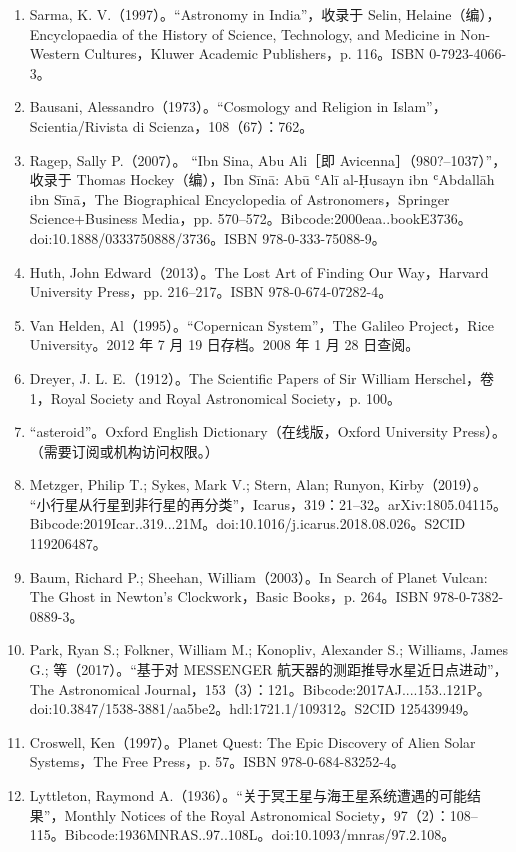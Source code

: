 \begin{enumerate}
\item Sarma, K. V.（1997）。“Astronomy in India”，收录于 Selin, Helaine（编），Encyclopaedia of the History of Science, Technology, and Medicine in Non-Western Cultures，Kluwer Academic Publishers，p. 116。ISBN 0-7923-4066-3。
\item Bausani, Alessandro（1973）。“Cosmology and Religion in Islam”，Scientia/Rivista di Scienza，108（67）：762。
\item Ragep, Sally P.（2007）。
“Ibn Sina, Abu Ali［即 Avicenna］（980?–1037）”，收录于 Thomas Hockey（编），Ibn Sīnā: Abū ʿAlī al-Ḥusayn ibn ʿAbdallāh ibn Sīnā，The Biographical Encyclopedia of Astronomers，Springer Science+Business Media，pp. 570–572。Bibcode:2000eaa..bookE3736。doi:10.1888/0333750888/3736。ISBN 978-0-333-75088-9。
\item Huth, John Edward（2013）。The Lost Art of Finding Our Way，Harvard University Press，pp. 216–217。ISBN 978-0-674-07282-4。
\item Van Helden, Al（1995）。“Copernican System”，The Galileo Project，Rice University。2012 年 7 月 19 日存档。2008 年 1 月 28 日查阅。
\item Dreyer, J. L. E.（1912）。The Scientific Papers of Sir William Herschel，卷 1，Royal Society and Royal Astronomical Society，p. 100。
\item “asteroid”。Oxford English Dictionary（在线版，Oxford University Press）。 （需要订阅或机构访问权限。）
\item Metzger, Philip T.; Sykes, Mark V.; Stern, Alan; Runyon, Kirby（2019）。
“小行星从行星到非行星的再分类”，Icarus，319：21–32。arXiv:1805.04115。Bibcode:2019Icar..319...21M。doi:10.1016/j.icarus.2018.08.026。S2CID 119206487。
\item Baum, Richard P.; Sheehan, William（2003）。In Search of Planet Vulcan: The Ghost in Newton's Clockwork，Basic Books，p. 264。ISBN 978-0-7382-0889-3。
\item Park, Ryan S.; Folkner, William M.; Konopliv, Alexander S.; Williams, James G.; 等（2017）。“基于对 MESSENGER 航天器的测距推导水星近日点进动”，The Astronomical Journal，153（3）：121。Bibcode:2017AJ....153..121P。doi:10.3847/1538-3881/aa5be2。hdl:1721.1/109312。S2CID 125439949。
\item Croswell, Ken（1997）。Planet Quest: The Epic Discovery of Alien Solar Systems，The Free Press，p. 57。ISBN 978-0-684-83252-4。
\item Lyttleton, Raymond A.（1936）。“关于冥王星与海王星系统遭遇的可能结果”，Monthly Notices of the Royal Astronomical Society，97（2）：108–115。Bibcode:1936MNRAS..97..108L。doi:10.1093/mnras/97.2.108。

\end{enumerate}
